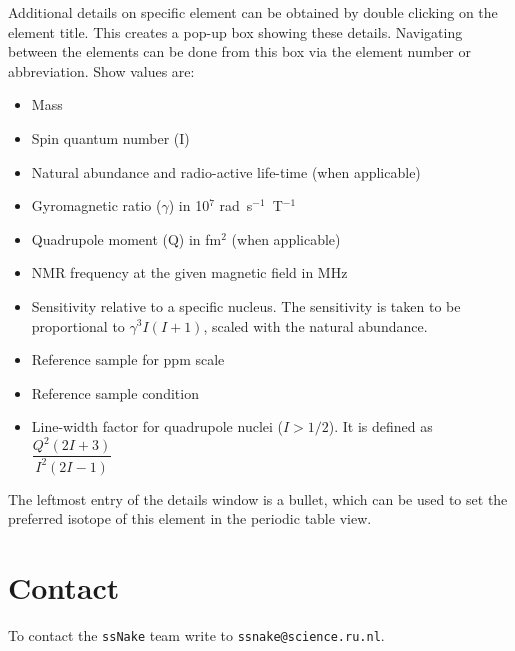 \documentclass[11pt,a4paper]{article}
\begin{document}
Additional details on specific element can be obtained by double clicking on the element title. This creates a pop-up box showing these details. Navigating between the elements can be done from this box via the element number or abbreviation. Show values are:
\begin{itemize}
\item Mass
\item Spin quantum number (I)
\item Natural abundance and radio-active life-time (when applicable)
\item Gyromagnetic ratio ($\gamma$) in 10$^7$ rad~s$^{-1}$~T$^{-1}$
\item Quadrupole moment (Q) in fm$^2$ (when applicable)
\item NMR frequency at the given magnetic field in MHz
\item Sensitivity relative to a specific nucleus. The sensitivity is taken to be proportional to $\gamma^3 I (I+1)$, scaled with the natural abundance.
\item Reference sample for ppm scale
\item Reference sample condition
\item Line-width factor for quadrupole nuclei ($I > 1/2$). It is defined as $\dfrac{Q^2(2I+3)}{I^2(2I-1)}$
\end{itemize}
The leftmost entry of the details window is a bullet, which can be used to set the preferred isotope of this element in the periodic table view.





\section{Contact}
To contact the \texttt{ssNake} team write to \texttt{ssnake@science.ru.nl}.



\end{document}
